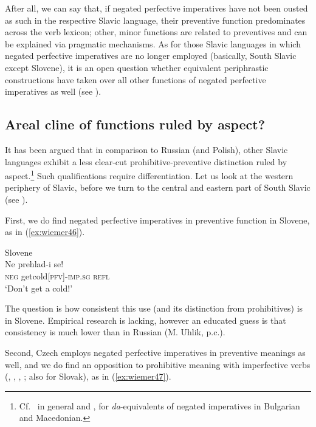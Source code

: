 \documentclass[output=paper,colorlinks,citecolor=brown]{langscibook}
\begin{document}
After all, we can say that, if negated perfective imperatives have not been ousted as such in the respective Slavic language, their preventive function predominates across the verb lexicon; other, minor functions are related to preventives and can be explained via pragmatic mechanisms. As for those Slavic languages in which negated perfective imperatives are no longer employed (basically, South Slavic except Slovene), it is an open question whether equivalent periphrastic constructions have taken over all other functions of negated perfective imperatives as well (see ).







\subsection{Areal cline of functions ruled by aspect?}
\label{subsec:areal}


It has been argued that in comparison to Russian (and Polish), other Slavic languages exhibit a less clear-cut prohibitive-preventive distinction ruled by aspect.\footnote{Cf.\ \citet[96]{Nilsson2013} in general and \citet[156]{Ivanova2014}, \citet{MitkovskaEtAl2017} for \textit{da}-equivalents of negated imperatives in Bulgarian and Macedonian.} Such qualifications require differentiation. Let us look at the western periphery of Slavic, before we turn to the central and eastern part of South Slavic (see ).


First, we do find negated perfective imperatives in preventive function in Slovene, as in (\ref{ex:wiemer46}).


\ea \textnormal{Slovene} \\
\label{ex:wiemer46} 
\gll Ne prehlad-i se! \\
\textsc{neg} get\textunderscore cold\textsc{[pfv]-imp.sg} \textsc{refl} \\
\glt `Don't get a cold!'
\z



\noindent The question is how consistent this use (and its distinction from prohibitives) is in Slovene. Empirical research is lacking, however an educated guess is that consistency is much lower than in Russian (M. Uhlik, p.c.).

Second, Czech employs negated perfective imperatives in preventive meanings as well, and we do find an opposition to prohibitive meaning with imperfective verbs (\citealt[322]{Trávníček1923}, \citealt[79--81]{Dokulil1948}, \citealt[60--61]{Kopečný1962}, \citealt{Kučera1984}; also \citealt[366--367]{Meyer2010} for Slovak), as in (\ref{ex:wiemer47}).
\end{document}
